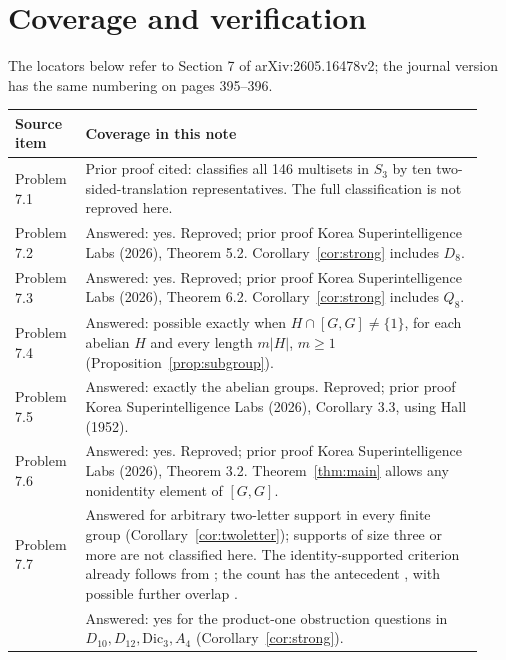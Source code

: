 \documentclass[11pt]{article}
\begin{document}
\section{Coverage and verification}
The locators below refer to Section 7 of arXiv:2605.16478v2; the journal
version has the same numbering on pages 395--396.
\begin{center}
\small
\begin{tabular}{@{}>{\raggedright\arraybackslash}p{0.14\linewidth}p{0.79\linewidth}@{}}
\toprule
Source item & Coverage in this note \\
\midrule
Problem 7.1 & Prior proof cited: \cite[Theorems 4.1--4.2]{KSL}
classifies all 146 multisets in $S_3$ by ten two-sided-translation
representatives. The full classification is not reproved here. \\
Problem 7.2 & Answered: yes. Reproved; prior proof Korea Superintelligence
Labs (2026), Theorem 5.2. Corollary~\ref{cor:strong} includes $D_8$. \\
Problem 7.3 & Answered: yes. Reproved; prior proof Korea Superintelligence
Labs (2026), Theorem 6.2. Corollary~\ref{cor:strong} includes $Q_8$. \\
Problem 7.4 & Answered: possible exactly when $H\cap[G,G]\ne\{1\}$,
for each abelian $H$ and every length $m|H|$, $m\geq1$
(Proposition~\ref{prop:subgroup}). \\
Problem 7.5 & Answered: exactly the abelian groups. Reproved; prior proof
Korea Superintelligence Labs (2026), Corollary 3.3, using Hall (1952). \\
Problem 7.6 & Answered: yes. Reproved; prior proof Korea Superintelligence
Labs (2026), Theorem 3.2. Theorem~\ref{thm:main} allows any
nonidentity element of $[G,G]$. \\
Problem 7.7 & Answered for arbitrary two-letter support in every finite
group (Corollary~\ref{cor:twoletter}); supports of size three or more
are not classified here. The identity-supported criterion already follows
from \cite[Corollary 4.3]{Aliabadi}; the count has the antecedent
\cite[Remark 2.5]{DePoi}, with possible further overlap
\cite{AliabadiTwo,DJW}. \\
\cite[Section 8]{KSL} & Answered: yes for the product-one obstruction
questions in $D_{10},D_{12},\mathrm{Dic}_3,A_4$
(Corollary~\ref{cor:strong}). \\
\bottomrule
\end{tabular}
\end{center}
\end{document}
